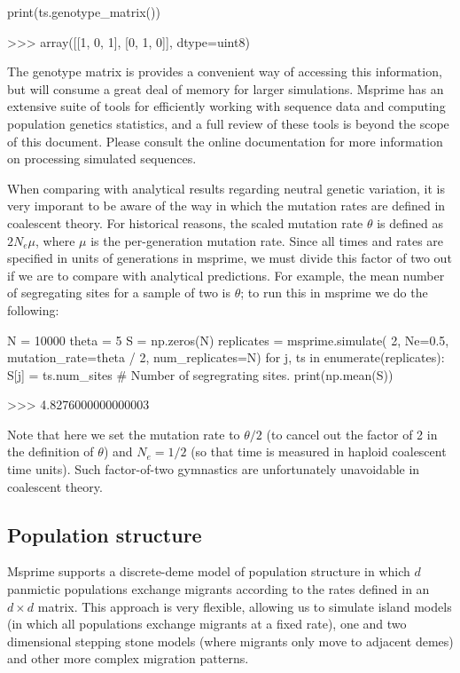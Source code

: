 \documentclass[graybox]{svmult}
\begin{document}
\begin{pythoncode}
print(ts.genotype_matrix())

>>> array([[1, 0, 1],
           [0, 1, 0]], dtype=uint8)
\end{pythoncode}

    The genotype matrix is provides a convenient way of accessing this
information, but will consume a great deal of memory for larger
simulations. Msprime has an extensive suite of tools for efficiently
working with sequence data and computing population genetics statistics,
and a full review of these tools is beyond the scope of this document.
Please consult the online documentation for more information on
processing simulated sequences.

When comparing with analytical results regarding neutral genetic
variation, it is very imporant to be aware of the way in which the
mutation rates are defined in coalescent theory. For historical reasons,
the scaled mutation rate \(\theta\) is defined as \(2N_e \mu\), where
\(\mu\) is the per-generation mutation rate. Since all times and rates
are specified in units of generations in msprime, we must divide this
factor of two out if we are to compare with analytical predictions. For
example, the mean number of segregating sites for a sample of two is
\(\theta\); to run this in msprime we do the following:

\begin{pythoncode}
N = 10000
theta = 5
S = np.zeros(N)
replicates = msprime.simulate(
    2, Ne=0.5, mutation_rate=theta / 2, num_replicates=N)
for j, ts in enumerate(replicates):
    S[j] = ts.num_sites  # Number of segregrating sites.
print(np.mean(S))

>>> 4.8276000000000003
\end{pythoncode}

    Note that here we set the mutation rate to \(\theta / 2\) (to cancel out
the factor of 2 in the definition of \(\theta\)) and \(N_e = 1/2\) (so
that time is measured in haploid coalescent time units). Such
factor-of-two gymnastics are unfortunately unavoidable in coalescent
theory.

\subsection{Population structure}\label{population-structure}

Msprime supports a discrete-deme model of population structure in which
\(d\) panmictic populations exchange migrants according to the rates
defined in an \(d \times d\) matrix. This approach is very flexible,
allowing us to simulate island models (in which all populations exchange
migrants at a fixed rate), one and two dimensional stepping stone models
(where migrants only move to adjacent demes) and other more complex
migration patterns.
\end{document}
